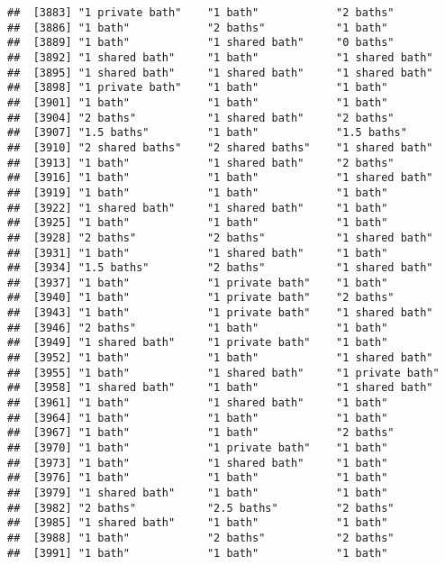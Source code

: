 \documentclass[
]{article}
\begin{document}
\begin{verbatim}
##  [3883] "1 private bath"    "1 bath"            "2 baths"          
##  [3886] "1 bath"            "2 baths"           "1 bath"           
##  [3889] "1 bath"            "1 shared bath"     "0 baths"          
##  [3892] "1 shared bath"     "1 bath"            "1 shared bath"    
##  [3895] "1 shared bath"     "1 shared bath"     "1 shared bath"    
##  [3898] "1 private bath"    "1 bath"            "1 bath"           
##  [3901] "1 bath"            "1 bath"            "1 bath"           
##  [3904] "2 baths"           "1 shared bath"     "2 baths"          
##  [3907] "1.5 baths"         "1 bath"            "1.5 baths"        
##  [3910] "2 shared baths"    "2 shared baths"    "1 shared bath"    
##  [3913] "1 bath"            "1 shared bath"     "2 baths"          
##  [3916] "1 bath"            "1 bath"            "1 shared bath"    
##  [3919] "1 bath"            "1 bath"            "1 bath"           
##  [3922] "1 shared bath"     "1 shared bath"     "1 bath"           
##  [3925] "1 bath"            "1 bath"            "1 bath"           
##  [3928] "2 baths"           "2 baths"           "1 shared bath"    
##  [3931] "1 bath"            "1 shared bath"     "1 bath"           
##  [3934] "1.5 baths"         "2 baths"           "1 shared bath"    
##  [3937] "1 bath"            "1 private bath"    "1 bath"           
##  [3940] "1 bath"            "1 private bath"    "2 baths"          
##  [3943] "1 bath"            "1 private bath"    "1 shared bath"    
##  [3946] "2 baths"           "1 bath"            "1 bath"           
##  [3949] "1 shared bath"     "1 private bath"    "1 bath"           
##  [3952] "1 bath"            "1 bath"            "1 shared bath"    
##  [3955] "1 bath"            "1 shared bath"     "1 private bath"   
##  [3958] "1 shared bath"     "1 bath"            "1 shared bath"    
##  [3961] "1 bath"            "1 shared bath"     "1 bath"           
##  [3964] "1 bath"            "1 bath"            "1 bath"           
##  [3967] "1 bath"            "1 bath"            "2 baths"          
##  [3970] "1 bath"            "1 private bath"    "1 bath"           
##  [3973] "1 bath"            "1 shared bath"     "1 bath"           
##  [3976] "1 bath"            "1 bath"            "1 bath"           
##  [3979] "1 shared bath"     "1 bath"            "1 bath"           
##  [3982] "2 baths"           "2.5 baths"         "2 baths"          
##  [3985] "1 shared bath"     "1 bath"            "1 bath"           
##  [3988] "1 bath"            "2 baths"           "2 baths"          
##  [3991] "1 bath"            "1 bath"            "1 bath"           

\end{verbatim}
\end{document}
